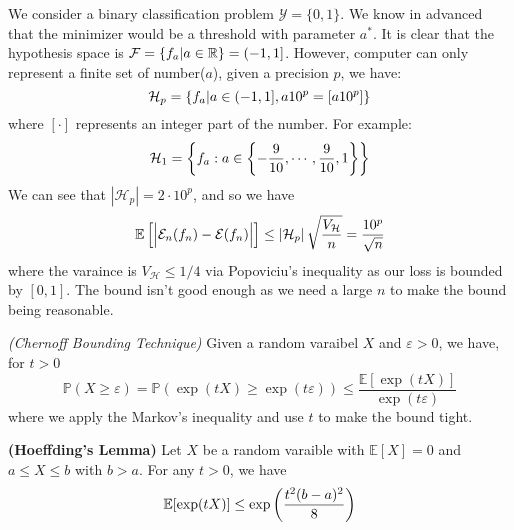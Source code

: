\begin{remark}
    We consider a binary classification problem $\mathcal{Y}=\{0, 1\}$. We know in advanced that the minimizer would be a threshold with parameter $a^*$. It is clear that the hypothesis space is $\mathcal{F}=\left\{ f_a | a \in \mathbb{R} \right\} = (-1, 1]$. However, computer can only represent a finite set of number($a$), given a precision $p$, we have:
    \begin{equation*}
        \mathcal{H}_p = \left\{ f_a | a\in(-1, 1], a10^p = [a10^p] \right\}
    \end{equation*}
    where $[\cdot]$ represents an integer part of the number. For example:
    \begin{equation*}
        \mathcal{H}_1 = \left\{ f_a : a \in\left\{ -\frac{9}{10}, \cdots, \frac{9}{10}, 1 \right\} \right\}
    \end{equation*}
    We can see that $|\mathcal{H}_p| = 2\cdot10^p$, and so we have 
    \begin{equation*}
        \mathbb{E}\left[ \Big| \mathcal{E}_n(f_n) - \mathcal{E}(f_n) \Big| \right] \le \left| \mathcal{H}_p \right|\sqrt{\frac{V_\mathcal{H}}{n}} = \frac{10^p}{\sqrt{n}}
    \end{equation*}
    where the varaince is $V_\mathcal{H}\le1/4$ via Popoviciu's inequality as our loss is bounded by $[0, 1]$. The bound isn't good enough as we need a large $n$ to make the bound being reasonable.
\end{remark}

\begin{remark}{\emph{(Chernoff Bounding Technique)}}
    Given a random varaibel $X$ and $\varepsilon>0$, we have, for $t>0$
    \begin{equation*}
        \mathbb{P}(X\ge\varepsilon) = \mathbb{P}(\exp(tX)\ge\exp(t\varepsilon)) \le \frac{\mathbb{E}[\exp(tX)]}{\exp(t\varepsilon)}
    \end{equation*}
    where we apply the Markov's inequality and use $t$ to make the bound tight.
\end{remark}

\begin{lemma}{\textbf{(Hoeffding's Lemma)}}
    Let $X$ be a random varaible with $\mathbb{E}[X] = 0$ and $a\le X \le b$ with $b>a$. For any $t>0$, we have 
    \begin{equation*}
        \mathbb{E}[\exp(tX)] \le \exp\left( \frac{t^2(b-a)^2}{8} \right)
    \end{equation*}     
\end{lemma}

